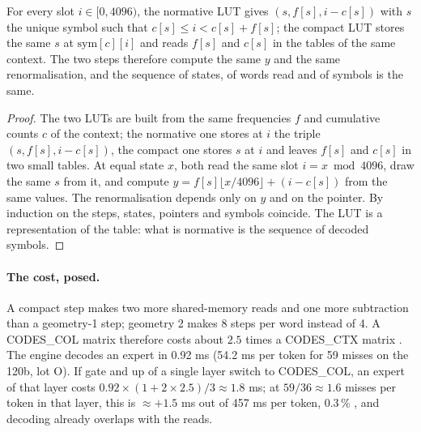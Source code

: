 \begin{lemme}\label{t3syn:lem:a2}
For every slot $i \in [0, 4096)$, the normative LUT gives $(s, f[s], i - c[s])$ with $s$ the unique symbol such that $c[s] \le i < c[s] + f[s]$; the compact LUT stores the same $s$ at $\mathrm{sym}[c][i]$ and reads $f[s]$ and $c[s]$ in the tables of the same context. The two steps therefore compute the same $y$ and the same renormalisation, and the sequence of states, of words read and of symbols is the same.
\end{lemme}

\begin{proof}
The two LUTs are built from the same frequencies $f$ and cumulative counts $c$ of the context; the normative one stores at $i$ the triple $(s, f[s], i - c[s])$, the compact one stores $s$ at $i$ and leaves $f[s]$ and $c[s]$ in two small tables. At equal state $x$, both read the same slot $i = x \bmod 4096$, draw the same $s$ from it, and compute $y = f[s]\lfloor x/4096\rfloor + (i - c[s])$ from the same values. The renormalisation depends only on $y$ and on the pointer. By induction on the steps, states, pointers and symbols coincide. The LUT is a representation of the table: what is normative is the sequence of decoded symbols.
\end{proof}

\paragraph{The cost, posed.} A compact step makes two more shared-memory reads and one more subtraction than a geometry-1 step; geometry 2 makes 8 steps per word instead of 4. A CODES\_COL matrix therefore costs about $2.5$ times a CODES\_CTX matrix \calc. The engine decodes an expert in 0.92 ms (54.2 ms per token for 59 misses on the 120b, lot O). If gate and up of a single layer switch to CODES\_COL, an expert of that layer costs $0.92 \times (1 + 2 \times 2.5)/3 \approx 1.8$ ms; at $59/36 \approx 1.6$ misses per token in that layer, this is $\approx +1.5$ ms out of 457 ms per token, 0.3\,\% \calc, and decoding already overlaps with the reads.

